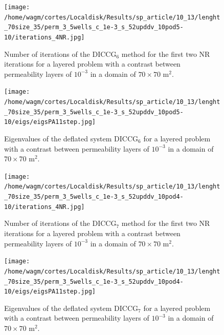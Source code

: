 \documentclass[12pt]{article}
\begin{document}
\begin{figure}[!h]
\centering
\begin{minipage}{.4\textwidth}
\vspace{-0.4cm}
\hspace{-1cm}
\texttt{[image: /home/wagm/cortes/Localdisk/Results/sp\_article/10\_13/lenght\_70size\_35/perm\_3\_5wells\_c\_1e-3\_s\_52upddv\_10pod5-10/iterations\_4NR.jpg]}
\vspace{-1.3cm}
\caption{Number of iterations of the DICCG$_6$ method for the first two NR iterations for a layered problem with a contrast between permeability layers of $10^{-3}$ in a domain of $70 \times 70$ m$^2$.}
\label{fig:NR_D6_3}
\end{minipage}%
\hspace{15mm}
\begin{minipage}{.4\textwidth}
 \centering
\texttt{[image: /home/wagm/cortes/Localdisk/Results/sp\_article/10\_13/lenght\_70size\_35/perm\_3\_5wells\_c\_1e-3\_s\_52upddv\_10pod5-10/eigs/eigsPA11step.jpg]}
\caption{Eigenvalues of the deflated system DICCG$_6$ for a layered problem with a contrast between permeability layers of $10^{-3}$ in a domain of $70 \times 70$ m$^2$.}
\label{fig:eigs_PA6_3}
\end{minipage}
\end{figure}

\begin{figure}[!h]
\centering
\begin{minipage}{.4\textwidth}
\vspace{-0.4cm}
\hspace{-1cm}
\texttt{[image: /home/wagm/cortes/Localdisk/Results/sp\_article/10\_13/lenght\_70size\_35/perm\_3\_5wells\_c\_1e-3\_s\_52upddv\_10pod4-10/iterations\_4NR.jpg]}
\vspace{-1.3cm}
\caption{Number of iterations of the DICCG$_7$ method for the first two NR iterations for a layered problem with a contrast between permeability layers of $10^{-3}$ in a domain of $70 \times 70$ m$^2$.}
\label{fig:NR_D7_3}
\end{minipage}%
\hspace{15mm}
\begin{minipage}{.4\textwidth}
 \centering
\texttt{[image: /home/wagm/cortes/Localdisk/Results/sp\_article/10\_13/lenght\_70size\_35/perm\_3\_5wells\_c\_1e-3\_s\_52upddv\_10pod4-10/eigs/eigsPA11step.jpg]}
\caption{Eigenvalues of the deflated system DICCG$_7$ for a layered problem with a contrast between permeability layers of $10^{-3}$ in a domain of $70 \times 70$ m$^2$.}
\label{fig:eigs_PA7_3}
\end{minipage}
\end{figure}
\newpage
\end{document}
